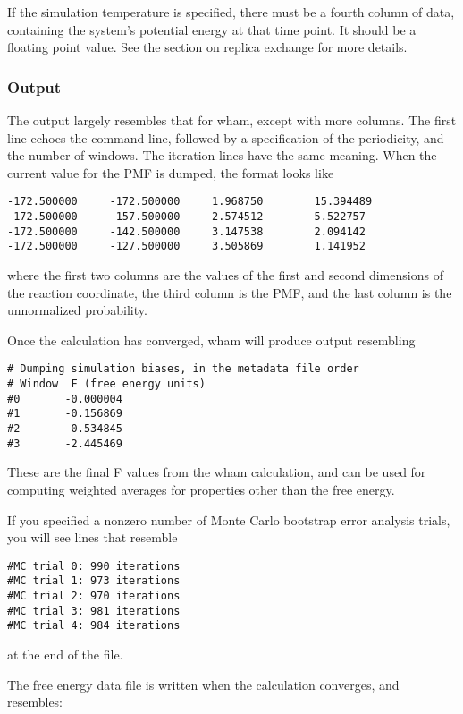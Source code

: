 \documentclass[12pt]{article}
\begin{document}
If the simulation temperature is specified, there must be a fourth column of
data, containing the system's potential energy at that time point.  It
should be a floating point value.  See the section on replica exchange for
more details.

\subsubsection{Output}

The output largely resembles that for wham, except with more columns.  The
first line echoes the command line, followed by a specification of the
periodicity, and the number of windows.  The iteration lines have the same
meaning.  When the current value for the PMF is dumped, the format looks
like 

\begin{verbatim}
-172.500000     -172.500000     1.968750        15.394489
-172.500000     -157.500000     2.574512        5.522757
-172.500000     -142.500000     3.147538        2.094142
-172.500000     -127.500000     3.505869        1.141952
\end{verbatim}
where the first two columns are the values of the first and second
dimensions of the reaction coordinate, the third column is the PMF, and the 
last column is the unnormalized probability.  

Once the calculation has converged, wham will produce output resembling

\begin{verbatim}
# Dumping simulation biases, in the metadata file order 
# Window  F (free energy units)
#0       -0.000004
#1       -0.156869
#2       -0.534845
#3       -2.445469
\end{verbatim}

These are the final F values from the wham calculation, and can be used for
computing weighted averages for properties other than the free energy.

If you specified a nonzero number of Monte Carlo bootstrap error analysis
trials, you will see lines that resemble

\begin{verbatim}
#MC trial 0: 990 iterations
#MC trial 1: 973 iterations
#MC trial 2: 970 iterations
#MC trial 3: 981 iterations
#MC trial 4: 984 iterations
\end{verbatim}
at the end of the file.

The free energy data file is written when the calculation converges, and
resembles:
\end{document}
